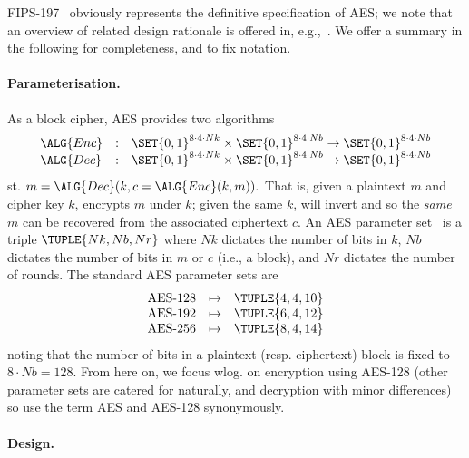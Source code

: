 
FIPS-197~\cite{FIPS:197} obviously represents the definitive specification
of AES; we note that an overview of related design rationale is offered in,
e.g.,~\cite{DaeRij:02}.  We offer a summary in the following \SEC[s] for
completeness, and to fix notation.

\paragraph{Parameterisation.}

As a block cipher, AES provides two algorithms
\[
\begin{array}{lcl}
\ALG{Enc} &:& \SET{ 0, 1 }^{8 \cdot 4 \cdot Nk} \times \SET{ 0, 1 }^{8 \cdot 4 \cdot Nb} \rightarrow \SET{ 0, 1 }^{8 \cdot 4 \cdot Nb} \\
\ALG{Dec} &:& \SET{ 0, 1 }^{8 \cdot 4 \cdot Nk} \times \SET{ 0, 1 }^{8 \cdot 4 \cdot Nb} \rightarrow \SET{ 0, 1 }^{8 \cdot 4 \cdot Nb} \\
\end{array}
\]
st.
$
m = \ALG{Dec}( k, c = \ALG{Enc}( k, m ) ) .
$
That is, given a plaintext $m$ and cipher key $k$,  encrypts $m$ 
under $k$; given the same $k$,  will invert  and so the
{\em same} $m$ can be recovered from the associated ciphertext $c$.  
An AES parameter set~\cite[Figure 4]{FIPS:197}
is a triple
$
\TUPLE{ Nk, Nb, Nr }
$
where 
$Nk$ dictates the number of bits in $k$,
$Nb$ dictates the number of bits in $m$ or $c$ (i.e., a block),
and
$Nr$ dictates the number of rounds.  The standard AES parameter sets are
\[
\begin{array}{lcl}
\mbox{AES-128} &\mapsto& \TUPLE{ 4, 4, 10 } \\
\mbox{AES-192} &\mapsto& \TUPLE{ 6, 4, 12 } \\
\mbox{AES-256} &\mapsto& \TUPLE{ 8, 4, 14 } \\
\end{array}
\]
noting that the number of bits in a plaintext (resp. ciphertext) block is
fixed to 
$
8 \cdot Nb = 128 .
$
From here on, we focus wlog. on encryption using AES-128 (other parameter 
sets are catered for naturally, and decryption with minor differences) so
use the term AES and AES-128 synonymously.

\paragraph{Design.}


